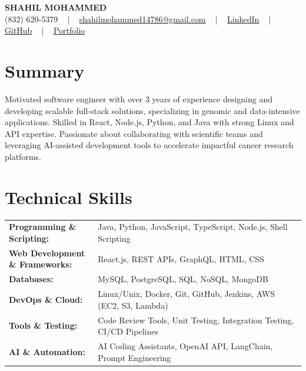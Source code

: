\documentclass[letterpaper,11pt]{article}
\begin{document}
\begin{center}
    {\fontsize{14pt}{12pt}\selectfont \textbf{\MakeUppercase{Shahil Mohammed}}}\\ \vspace{2pt}
    \fontsize{10pt}{12pt}\selectfont (832) 620-5379 ~ | ~ \href{mailto:shahilmohammed14786@gmail.com}{shahilmohammed14786@gmail.com} ~ | ~  
    \href{https://www.linkedin.com/in/shahil-mohammed-9652931a1/}{\color{blue}\underline{LinkedIn}}  ~ | ~ 
    \href{https://github.com/freakbeast14}{\color{blue}\underline{GitHub}} ~ | ~ 
    \href{https://shahil-mohammed.netlify.app/}{\color{blue}\underline{Portfolio}}
    \vspace{-8pt}
\end{center}

\section{Summary}
\fontsize{9pt}{10pt}\selectfont
Motivated software engineer with over 3 years of experience designing and developing scalable full-stack solutions, specializing in genomic and data-intensive applications. Skilled in React, Node.js, Python, and Java with strong Linux and API expertise. Passionate about collaborating with scientific teams and leveraging AI-assisted development tools to accelerate impactful cancer research platforms.
 \vspace{-5pt}
 
\section{Technical Skills}
        \vspace{-14pt}
        \begin{table}[h]
            \fontsize{9pt}{10pt}\selectfont
            \begin{tabular}{p{0.3\linewidth} p{0.7\linewidth}}
                \textbf{Programming \& Scripting:} & Java, Python, JavaScript, TypeScript, Node.js, Shell Scripting \\
                \textbf{Web Development \& Frameworks:} & React.js, REST APIs, GraphQL, HTML, CSS \\
                \textbf{Databases:} & MySQL, PostgreSQL, SQL, NoSQL, MongoDB \\
                \textbf{DevOps \& Cloud:} & Linux/Unix, Docker, Git, GitHub, Jenkins, AWS (EC2, S3, Lambda) \\
                \textbf{Tools \& Testing:} & Code Review Tools, Unit Testing, Integration Testing, CI/CD Pipelines \\
                \textbf{AI \& Automation:} & AI Coding Assistants, OpenAI API, LangChain, Prompt Engineering \\
            \end{tabular}
        \end{table}
 \vspace{-15pt}
 
\end{document}
